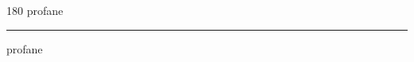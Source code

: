 
\begin{frame}
\begin{center}
\begin{turn}{180}
{\fontsize{2.5cm}{1em}\selectfont profane}
\end{turn}
\vspace{1em}\par  
\hrule
\vspace{1em}\par  
{\fontsize{2.5cm}{1em}\selectfont profane}
\end{center}
\end{frame}

